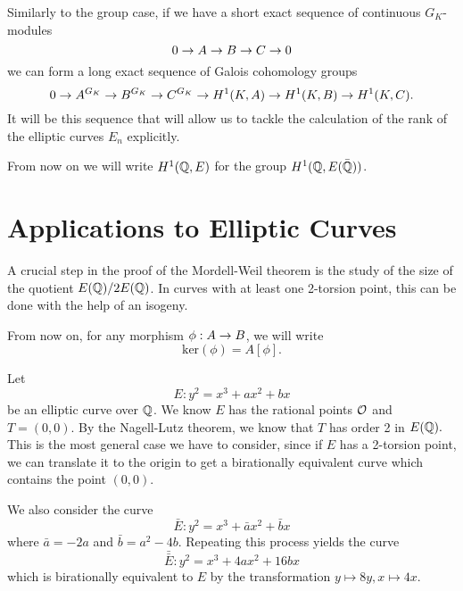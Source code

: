 \documentclass[12pt, a4paper]{report}
\begin{document}
Similarly to the group case, if we have a short exact sequence of continuous $G_K$-modules
\[ 0 \rightarrow A \rightarrow B \rightarrow C \rightarrow 0\]
we can form a long exact sequence of Galois cohomology groups
\[0 \rightarrow A^{G_K} \rightarrow B^{G_K} \rightarrow C^{G_K} \rightarrow H^1(K,A) \rightarrow H^1(K,B) \rightarrow H^1(K,C).\]
It will be this sequence that will allow us to tackle the calculation of the
rank of the elliptic curves $E_n$ explicitly.

\begin{remark}
  From now on we will write $H^1({\mathbb Q}, E)$ for the group $H^1({\mathbb Q}, E(\bar{{\mathbb Q}}))$.
\end{remark}

\section{Applications to Elliptic Curves} \label{sec:applications}
A crucial step in the proof of the Mordell-Weil theorem is the study of the size
of the quotient $E({\mathbb Q}) / 2 E({\mathbb Q})$. In curves with at least one 2-torsion
point, this can be done with the help of an isogeny.

\begin{remark}
  From now on, for any morphism $\phi : A \rightarrow B$, we
  will write $$\text{ker}(\phi) = A[\phi].$$
\end{remark}

Let $$E : y^2 = x^3 + ax^2 + bx$$ be an elliptic curve over ${\mathbb Q}$. We know $E$
has the rational points ${\mathcal O}$ and $ T = (0,0)$. By the Nagell-Lutz theorem, we
know that $T$ has order 2 in $E({\mathbb Q}).$ This is the most general case we have to
consider, since if $E$ has a 2-torsion point, we can translate it to the origin
to get a birationally equivalent curve which contains the point $(0,0).$

We also consider the curve
\[ \bar{E} : y^2 = x^3 + \bar{a}x^2 + \bar{b}x \]
where $\bar{a} = -2a$ and $\bar{b} = a^2 - 4b$. Repeating this process yields
the curve
\[ \bar{\bar{E}} : y^2 = x^3 +  4ax^2 + 16bx\]
which is birationally equivalent to $E$ by the transformation $y \mapsto 8y,
x \mapsto 4x$.
\end{document}
